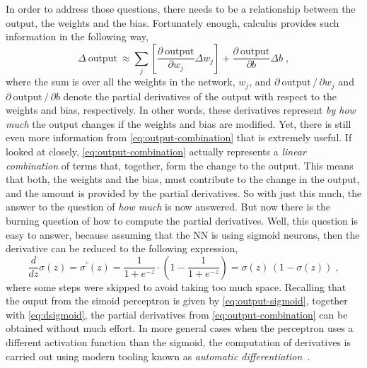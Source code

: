 In order to address those questions, there needs to be a relationship between the output, the weights and the bias. Fortunately enough, calculus provides such information in the 
following way,
\begin{equation}
    \Delta \ \text{output} \ \approx \sum_{j} \left[ \frac{\partial \ \text{output}}{\partial w_j} \Delta w_j \right] + \frac{\partial \ \text{output}}{\partial b} \Delta b
    \; ,
    \label{eq:output-combination}
\end{equation}
where the sum is over all the weights in the network, \(w_j\), and \(\partial \ \text{output} \, / \, \partial w_j\) and \(\partial \ \text{output} \, / \, \partial b\) denote 
the partial derivatives of the output with respect to the weights and bias, respectively. 
In other words, these derivatives represent \emph{by how much} the output changes if the 
weights and bias are modified. Yet, there is still even more information from \autoref{eq:output-combination} 
that is extremely useful. If looked at closely, \autoref{eq:output-combination} actually 
represents a \emph{linear combination} of terms that, together, form the change to the 
output. This means that both, the weights and the bias, must contribute to the change in 
the output, and the amount is provided by the partial derivatives. So with just this much, 
the answer to the question of \emph{how much} is now answered. But now there is the burning 
question of how to compute the partial derivatives. Well, this question is easy to answer, 
because assuming that the NN is using sigmoid neurons, then the derivative can be reduced 
to the following expression,
\begin{equation}
    \frac{d}{dz} \sigma (z) = \sigma^{\prime} (z) = \frac{1}{1 + e^{-z}}  \cdot \left(1 - \frac{1}{1 + e^{-z}}\right) = \sigma (z) \, \left(1 - \sigma (z)\right)
    \; ,
    \label{eq:dsigmoid}
\end{equation}
where some steps were skipped to avoid taking too much space. Recalling that the ouput from 
the simoid perceptron is given by \autoref{eq:output-sigmoid}, together with \autoref{eq:dsigmoid}, 
the partial derivatives from \autoref{eq:output-combination} can be obtained without much
effort. In more general cases when the perceptron uses a different activation function than 
the sigmoid, the computation of derivatives is carried out using modern tooling known as 
\emph{automatic differentiation}~\cite{baydinAutomaticDifferentiationMachine2018}.

